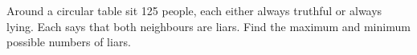 Around a circular table sit 125 people, each either always truthful or always lying. Each says that both neighbours are liars. Find the maximum and minimum possible numbers of liars.
